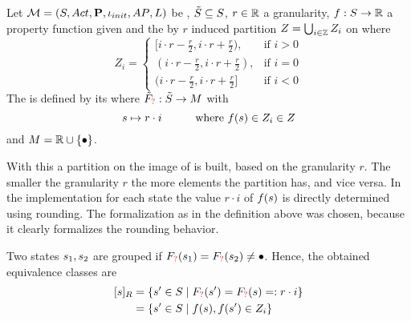 \documentclass[preview]{standalone}
\begin{document}
\begin{definition}
	Let ${{{\mathcal{M}}}} = {{({S}, {Act}, {\textbf{P}}, {\iota_{init}}, {AP}, {L})}}$ be \achgphN, ${\tilde{{S}}} \subseteq {S}$, $r \in {\mathbb{R}}$ a granularity, ${f} : {S} \to {\mathbb{R}}$ a property function given and the by $r$ induced partition $Z =\bigcup_{i \in {\mathbb{Z}}}Z_i$ on \realnums where
	\[
		Z_i = 
		\begin{cases}
			[i \cdot r -  \frac{r}{2}, i \cdot r +  \frac{r}{2}), &\text{if } i > 0 \\
			(i \cdot r -  \frac{r}{2}, i \cdot r +  \frac{r}{2}), &\text{if } i = 0 \\
			(i \cdot r -  \frac{r}{2}, i \cdot r +  \frac{r}{2}]&\text{if } i < 0
		\end{cases}
	\]
	The \viewN \viewprop is defined by its \grpfctN \gfctprop where ${{\tilde{F}_{{{\color{red}?}}}}} : {\tilde{{S}}} \to {\ensuremath{{M}}}$ with
	\[
	{s} \mapsto r \cdot i \quad\quad\quad \text{where } {f}({s}) \in Z_i \in Z
	\]
	and $\imggrp = \realnums \cup \remset$.
\end{definition}

With this \viewN a partition on the image of \propfct is built, based on the granularity $r$. 
The smaller the granularity $r$ the more elements the partition has, and vice versa. In the implementation for each state \state the value $r \cdot i$ of ${f}({s})$ is directly determined using rounding. The formalization as in the definition above was chosen, because it clearly formalizes the rounding behavior.


Two states ${s}_1, {s}_2$ are grouped if ${{F_{{{\color{red}?}}}}}({s}_1) = {{F_{{{\color{red}?}}}}}({s}_2) \neq {\bullet}$. Hence, the obtained equivalence classes are
\begin{align*}
	{\ensuremath{{[{s}]_{{R}}}}} &= \{{s}' \in {S} \mid {\ensuremath{{F_{{{\color{red}?}}}}}}({s}') = {{F_{{{\color{red}?}}}}}({s}) =: r \cdot i\} \\
	&= \{{s}' \in {S} \mid {f}({s}), {f}({s}') \in Z_i\}
\end{align*}
\end{document}
